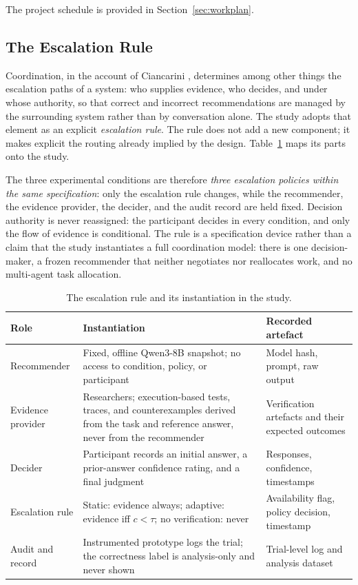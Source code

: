 \documentclass[oneside,final,14pt,a4paper]{extreport}
\begin{document}
The project schedule is provided in Section~\ref{sec:workplan}.

\subsection{The Escalation Rule}
\label{subsec:design}

Coordination, in the account of Ciancarini \cite{Ciancarini2027}, determines
among other things the escalation paths of a system: who supplies evidence, who
decides, and under whose authority, so that correct and incorrect
recommendations are managed by the surrounding system rather than by
conversation alone. The study adopts that element as an explicit
\emph{escalation rule}. The rule does not add a new component; it makes
explicit the routing already implied by the design. Table~\ref{tab:escalation}
maps its parts onto the study.

The three experimental conditions are therefore \emph{three escalation policies
within the same specification}: only the escalation rule changes, while the
recommender, the evidence provider, the decider, and the audit record are held
fixed. Decision authority is never reassigned: the participant decides in every
condition, and only the flow of evidence is conditional. The rule is a
specification device rather than a claim that the study instantiates a full
coordination model: there is one decision-maker, a frozen recommender that
neither negotiates nor reallocates work, and no multi-agent task allocation.

\begin{table}[H]
\centering
\caption{The escalation rule and its instantiation in the study.}
\label{tab:escalation}
\small
\begin{tabular}{@{}>{\raggedright\arraybackslash}p{2.6cm}>{\raggedright\arraybackslash}p{7.4cm}>{\raggedright\arraybackslash}p{4.2cm}@{}}
\toprule
Role & Instantiation & Recorded artefact \\
\midrule
Recommender & Fixed, offline Qwen3-8B snapshot; no access to condition,
policy, or participant & Model hash, prompt, raw output \\
Evidence provider & Researchers; execution-based tests, traces, and
counterexamples derived from the task and reference answer, never from the
recommender & Verification artefacts and their expected outcomes \\
Decider & Participant records an initial answer, a prior-answer confidence
rating, and a final judgment & Responses, confidence, timestamps \\
Escalation rule & Static: evidence always; adaptive: evidence iff $c<\tau$;
no verification: never & Availability flag, policy decision, timestamp \\
Audit and record & Instrumented prototype logs the trial; the correctness
label is analysis-only and never shown & Trial-level log and analysis
dataset \\
\bottomrule
\end{tabular}
\end{table}
\end{document}
